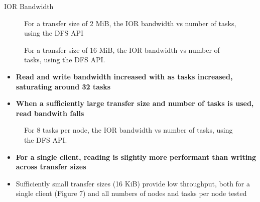 \documentclass[final]{beamer}
\newlength{\colwidth}
\begin{document}
\begin{frame}[t, fragile]
\begin{columns}[t]
\begin{column}{\colwidth}
\begin{block}{IOR Bandwidth}
    \begin{figure}
      \centering
         
      \caption{For a transfer size of 2 MiB, the IOR bandwidth vs number of tasks, using the DFS API}
      \label{fig:ior_bw-vs-tasks_hue-nodes_2M}
    \end{figure}
    \begin{figure}
      \centering
         
      \caption{For a transfer size of 16 MiB, the IOR bandwidth vs number of tasks, using the DFS API.}
      \label{fig:ior_bw-vs-tasks_hue-nodes_16M}
    \end{figure}
    \normalsize{
    \begin{itemize}
      \item \textbf{Read and write bandwidth increased with as tasks increased, saturating around 32 tasks}
      \item \textbf{When a sufficiently large transfer size and number of tasks is used, read bandwith falls}
    \end{itemize}
    }


    \begin{figure}
      \centering
         
      \caption{For 8 tasks per node, the IOR bandwidth vs number of tasks, using the DFS API.}
    \end{figure}
    \normalsize{
    \begin{itemize}
      \item \textbf{For a single client, reading is slightly more performant than writing across transfer sizes}
      \item Sufficiently small transfer sizes (16 KiB) provide low throughput, both for a single client (Figure 7) and all numbers of nodes and tasks per node tested
    \end{itemize}
    }
    

\end{block}
\end{column}
\end{columns}
\end{frame}
\end{document}
